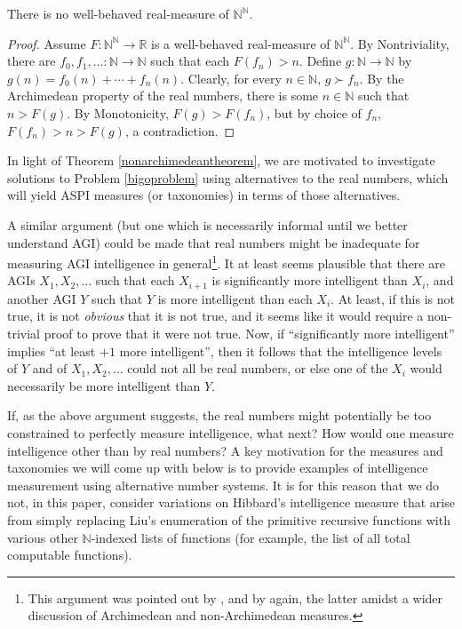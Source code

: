 \documentclass[twoside,11pt]{article}
\begin{document}
\begin{theorem}
\label{nonarchimedeantheorem}
    There is no well-behaved real-measure of $\mathbb N^\mathbb N$.
\end{theorem}

\begin{proof}
    Assume $F:\mathbb N^\mathbb N\to\mathbb R$ is a well-behaved real-measure
    of $\mathbb N^\mathbb N$.
    By Nontriviality, there are
    $f_0,f_1,\ldots:\mathbb N\to\mathbb N$
    such that each $F(f_n)>n$.
    Define $g:\mathbb N\to\mathbb N$ by $g(n)=f_0(n)+\cdots+f_n(n)$.
    Clearly, for every $n\in\mathbb N$, $g\succ f_{n}$.
    By the Archimedean property of the real numbers, there is some $n\in\mathbb N$
    such that $n>F(g)$. By Monotonicity, $F(g)>F(f_{n})$,
    but by choice of $f_{n}$, $F(f_{n})>n>F(g)$, a contradiction.
\end{proof}

In light of Theorem \ref{nonarchimedeantheorem}, we are motivated to investigate
solutions to Problem \ref{bigoproblem} using alternatives to the real numbers,
which will yield ASPI measures (or taxonomies) in terms of those alternatives.

A similar argument (but one which is necessarily informal until we better understand AGI)
could be made that real numbers might be inadequate for measuring
AGI intelligence in general\footnote{
This argument was pointed out by \citet{ioi1},
and by \citet{alexander2020arch} again, the latter amidst a wider discussion of
Archimedean and non-Archimedean measures.}.
It at least seems plausible that there are AGIs $X_1,X_2,\ldots$
such that each $X_{i+1}$ is significantly more intelligent than $X_i$, and another AGI
$Y$ such that $Y$ is more intelligent than each $X_i$. At least, if this is not true,
it is not \emph{obvious} that it is not true, and it seems like it would require a
non-trivial proof to prove that it were not true. Now, if ``significantly more
intelligent'' implies ``at least $+1$ more intelligent'', then it follows that the
intelligence levels of $Y$ and of $X_1,X_2,\ldots$ could not all be real numbers,
or else one of the $X_i$ would necessarily be more intelligent than $Y$.

If, as the above argument suggests, the real numbers might potentially be
too constrained to perfectly measure intelligence, what next? How would one measure
intelligence other than by real numbers?
A key motivation for the measures and taxonomies we will come up with below is to
provide examples of intelligence measurement using alternative number systems.
It is for this reason that we do not, in this paper, consider variations on Hibbard's
intelligence measure that arise from simply replacing Liu's enumeration of the primitive
recursive functions with various other $\mathbb N$-indexed lists of functions
(for example, the list of all total computable functions).
\end{document}
